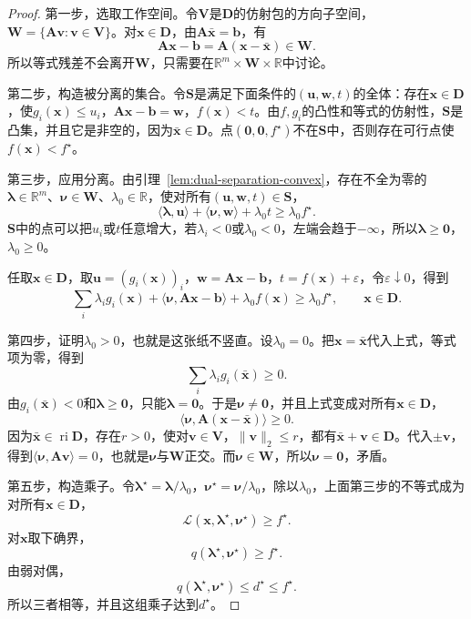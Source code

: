 \begin{proof}
 第一步，选取工作空间。令$\bm{V}$是$\bm{D}$的仿射包的方向子空间，$\bm{W}=\{\bm{A}\bm{v}:\bm{v}\in\bm{V}\}$。对$\bm{x}\in\bm{D}$，由$\bm{A}\bar{\bm{x}}=\bm{b}$，有
 \[
  \bm{A}\bm{x}-\bm{b}=\bm{A}(\bm{x}-\bar{\bm{x}})\in\bm{W}.
 \]
 所以等式残差不会离开$\bm{W}$，只需要在$\mathbb{R}^m\times\bm{W}\times\mathbb{R}$中讨论。

 第二步，构造被分离的集合。令$\bm{S}$是满足下面条件的$(\bm{u},\bm{w},t)$的全体：存在$\bm{x}\in\bm{D}$，使$g_i(\bm{x})\leq u_i$，$\bm{A}\bm{x}-\bm{b}=\bm{w}$，$f(\bm{x})<t$。由$f,g_i$的凸性和等式的仿射性，$\bm{S}$是凸集，并且它是非空的，因为$\bar{\bm{x}}\in\bm{D}$。点$(\bm{0},\bm{0},f^\star)$不在$\bm{S}$中，否则存在可行点使$f(\bm{x})<f^\star$。

 第三步，应用分离。由引理~\ref{lem:dual-separation-convex}，存在不全为零的$\bm{\lambda}\in\mathbb{R}^m$、$\bm{\nu}\in\bm{W}$、$\lambda_0\in\mathbb{R}$，使对所有$(\bm{u},\bm{w},t)\in\bm{S}$，
 \[
  \langle\bm{\lambda},\bm{u}\rangle+\langle\bm{\nu},\bm{w}\rangle+\lambda_0t\geq\lambda_0f^\star.
 \]
 $\bm{S}$中的点可以把$u_i$或$t$任意增大，若$\lambda_i<0$或$\lambda_0<0$，左端会趋于$-\infty$，所以$\bm{\lambda}\geq\bm{0}$，$\lambda_0\geq0$。

 任取$\bm{x}\in\bm{D}$，取$\bm{u}=(g_i(\bm{x}))_i$，$\bm{w}=\bm{A}\bm{x}-\bm{b}$，$t=f(\bm{x})+\varepsilon$，令$\varepsilon\downarrow0$，得到
 \[
  \sum_i\lambda_ig_i(\bm{x})+\langle\bm{\nu},\bm{A}\bm{x}-\bm{b}\rangle+\lambda_0f(\bm{x})\geq\lambda_0f^\star,\qquad\bm{x}\in\bm{D}.
 \]

 第四步，证明$\lambda_0>0$，也就是这张纸不竖直。设$\lambda_0=0$。把$\bm{x}=\bar{\bm{x}}$代入上式，等式项为零，得到
 \[
  \sum_i\lambda_ig_i(\bar{\bm{x}})\geq0.
 \]
 由$g_i(\bar{\bm{x}})<0$和$\bm{\lambda}\geq\bm{0}$，只能$\bm{\lambda}=\bm{0}$。于是$\bm{\nu}\neq\bm{0}$，并且上式变成对所有$\bm{x}\in\bm{D}$，
 \[
  \langle\bm{\nu},\bm{A}(\bm{x}-\bar{\bm{x}})\rangle\geq0.
 \]
 因为$\bar{\bm{x}}\in\operatorname{ri}\bm{D}$，存在$r>0$，使对$\bm{v}\in\bm{V}$，$\lVert\bm{v}\rVert_2\leq r$，都有$\bar{\bm{x}}+\bm{v}\in\bm{D}$。代入$\pm\bm{v}$，得到$\langle\bm{\nu},\bm{A}\bm{v}\rangle=0$，也就是$\bm{\nu}$与$\bm{W}$正交。而$\bm{\nu}\in\bm{W}$，所以$\bm{\nu}=\bm{0}$，矛盾。

 第五步，构造乘子。令$\bm{\lambda}^\star=\bm{\lambda}/\lambda_0$，$\bm{\nu}^\star=\bm{\nu}/\lambda_0$，除以$\lambda_0$，上面第三步的不等式成为对所有$\bm{x}\in\bm{D}$，
 \[
  \mathcal{L}(\bm{x},\bm{\lambda}^\star,\bm{\nu}^\star)\geq f^\star.
 \]
 对$\bm{x}$取下确界，
 \[
  q(\bm{\lambda}^\star,\bm{\nu}^\star)\geq f^\star.
 \]
 由弱对偶，
 \[
  q(\bm{\lambda}^\star,\bm{\nu}^\star)\leq d^\star\leq f^\star.
 \]
 所以三者相等，并且这组乘子达到$d^\star$。
\end{proof}

